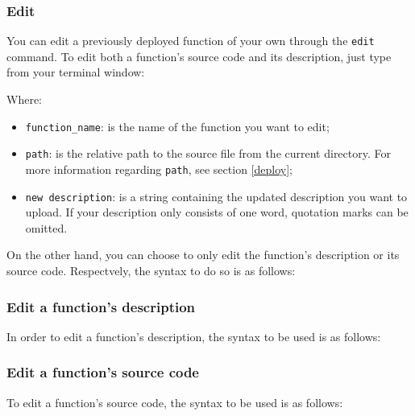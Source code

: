 \subsubsection{Edit}
You can edit a previously deployed function of your own through the \texttt{edit} command. To edit both a function's source code and its description, just type from your terminal window:
\begin{center}
\end{center}
Where:
\begin{itemize}
\item \texttt{function\_name}: is the name of the function you want to edit;
\item \texttt{path}: is the relative path to the source file from the current directory. For more information regarding \texttt{path}, see section \ref{deploy};
\item \texttt{new description}: is a string containing the updated description you want to upload. If your description only consists of one word, quotation marks can be omitted.
 \end{itemize}

On the other hand, you can choose to only edit the function's description or its source code. Respectvely, the syntax to do so is as follows:
\begin{center}
\end{center}
\subsubsection{Edit a function's description}
In order to edit a function's description, the syntax to be used is as follows:
\begin{center}
\end{center}

\subsubsection{Edit a function's source code}
To edit a function's source code, the syntax to be used is as follows:
\begin{center}
\end{center}


